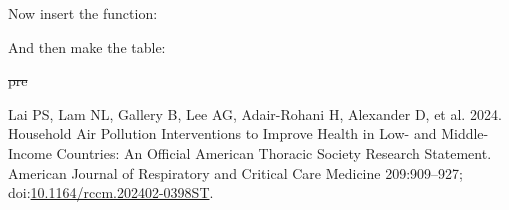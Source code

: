 \documentclass[
  letterpaper,
  DIV=11,
  numbers=noendperiod]{scrartcl}
\newlength{\cslhangindent}
\newenvironment{CSLReferences}[2] %
 {\begin{list}{}{%
  \setlength{\itemindent}{0pt} %
  \setlength{\leftmargin}{0pt} %
  \setlength{\parsep}{0pt} %
  \ifodd #1
   \setlength{\leftmargin}{\cslhangindent} %
   \setlength{\itemindent}{-1\cslhangindent} %
  \fi
  \setlength{\itemsep}{#2\baselineskip}}} %
 {\end{list}} %
\providecommand{\DIFdeltex}[1]{{\protect\color{red}\sout{#1}}}                      %
\providecommand{\DIFaddbegin}{} %
\providecommand{\DIFaddend}{} %
\providecommand{\DIFdelbegin}{} %
\providecommand{\DIFdelend}{} %
\providecommand{\DIFdel}[1]{\texorpdfstring{\DIFdeltex{#1}}{}} %
\newcommand{\DIFscaledelfig}{0.5}
\newlength{\DIFdelgraphicswidth} %
\newlength{\DIFdelgraphicsheight} %
\newcommand{\DIFaddincludegraphics}[2][]{{\color{blue}\fbox{\DIFOincludegraphics[#1]{#2}}}} %
\newcommand{\DIFdelincludegraphics}[2][]{%
\sbox{\DIFdelgraphicsbox}{\DIFOincludegraphics[#1]{#2}}%
\settoboxwidth{\DIFdelgraphicswidth}{\DIFdelgraphicsbox} %
\settoboxtotalheight{\DIFdelgraphicsheight}{\DIFdelgraphicsbox} %
\scalebox{\DIFscaledelfig}{%
\parbox[b]{\DIFdelgraphicswidth}{\usebox{\DIFdelgraphicsbox}\\[-\baselineskip] \rule{\DIFdelgraphicswidth}{0em}}\llap{\resizebox{\DIFdelgraphicswidth}{\DIFdelgraphicsheight}{%
\setlength{\unitlength}{\DIFdelgraphicswidth}%
\begin{picture}(1,1)%
\thicklines\linethickness{2pt} %
{\color[rgb]{1,0,0}\put(0,0){\framebox(1,1){}}}%
{\color[rgb]{1,0,0}\put(0,0){\line( 1,1){1}}}%
{\color[rgb]{1,0,0}\put(0,1){\line(1,-1){1}}}%
\end{picture}%
}\hspace*{3pt}}} %
} %
\DeclareRobustCommand{\DIFaddbegin}{\DIFOaddbegin \let\includegraphics\DIFaddincludegraphics} %
\DeclareRobustCommand{\DIFaddend}{\DIFOaddend \let\includegraphics\DIFOincludegraphics} %
\DeclareRobustCommand{\DIFdelbegin}{\DIFOdelbegin \let\includegraphics\DIFdelincludegraphics} %
\DeclareRobustCommand{\DIFdelend}{\DIFOaddend \let\includegraphics\DIFOincludegraphics} %
\begin{document}
Now insert the function:

And then make the table:

\DIFdelbegin %
\DIFdel{pre}%
\DIFdelend \DIFaddbegin {}\label{refs}
\begin{CSLReferences}{1}{1}
\DIFaddend Lai PS, Lam NL, Gallery B, Lee AG, Adair-Rohani H, Alexander D, et al.
2024. Household {Air Pollution Interventions} to {Improve Health} in
{Low-} and {Middle-Income Countries}: {An Official American Thoracic
Society Research Statement}. American Journal of Respiratory and
Critical Care Medicine 209:909--927;
doi:\href{https://doi.org/10.1164/rccm.202402-0398ST}{10.1164/rccm.202402-0398ST}.

\end{CSLReferences}
\end{document}

